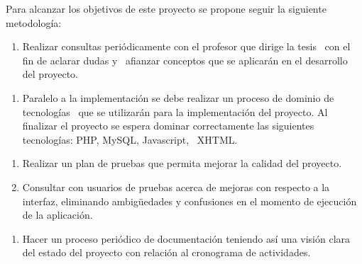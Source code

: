 \documentclass[12pt,letterpaper,oneside]{article}
\begin{document}
\bigskip

Para alcanzar los objetivos de este proyecto se propone seguir la
siguiente metodología:


\bigskip


\begin{enumerate}
\item Realizar consultas periódicamente con el profesor que dirige la
tesis \ con el fin de aclarar dudas y \ afianzar conceptos que se
aplicarán en el desarrollo del proyecto.


\bigskip
\end{enumerate}

\begin{enumerate}
\item Paralelo a la implementación se debe realizar un proceso de
dominio de tecnologías \ que se utilizarán para la implementación
del proyecto. Al finalizar el proyecto se espera dominar correctamente
las siguientes tecnologías: PHP, MySQL, Javascript, \ XHTML.


\bigskip
\end{enumerate}

\begin{enumerate}
\item Realizar un plan de pruebas que permita mejorar la calidad del
proyecto.


\bigskip
\item Consultar con usuarios de pruebas acerca de mejoras con respecto a
la interfaz, eliminando ambig\"uedades y confusiones en el momento de
ejecución de la aplicación.
\end{enumerate}

\bigskip


\begin{enumerate}
\item Hacer un proceso periódico de documentación teniendo así una
visión clara del estado del proyecto con relación al cronograma de
actividades.
\end{enumerate}

\bigskip


\bigskip


\bigskip


\bigskip


\bigskip


\bigskip


\bigskip


\bigskip


\bigskip


\bigskip
\end{document}
